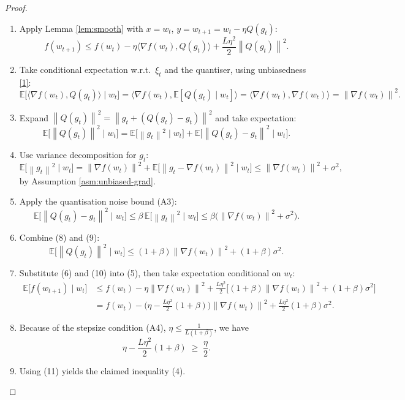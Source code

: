 \documentclass[11pt]{article}
\newcommand{\EE}{\mathbb{E}}
\newcommand{\norm}[1]{\left\lVert#1\right\rVert}
\newcommand{\inner}[2]{\langle #1,#2\rangle}
\begin{document}
\begin{proof}
\begin{enumerate}[label=[Step \arabic*]]
\item Apply Lemma \ref{lem:smooth} with $x=w_t$, $y=w_{t+1}=w_t-\eta Q(g_t)$:
\[
f(w_{t+1})\le f(w_t)-\eta\inner{\nabla f(w_t)}{Q(g_t)}+\frac{L\eta^2}{2}\norm{Q(g_t)}^2 .
\tag{5}
\]
\item Take conditional expectation w.r.t.\ $\xi_t$ and the quantiser, using unbiasedness \eqref{1}:
\[
\EE\!\big[\inner{\nabla f(w_t)}{Q(g_t)}\mid w_t\big]
= \inner{\nabla f(w_t)}{\EE[Q(g_t)\mid w_t]}
= \inner{\nabla f(w_t)}{\nabla f(w_t)} = \norm{\nabla f(w_t)}^2 .
\tag{6}
\]
\item Expand $\norm{Q(g_t)}^2=\norm{g_t+(Q(g_t)-g_t)}^2$ and take expectation:
\[
\EE\!\big[\norm{Q(g_t)}^2\mid w_t\big]
= \EE\!\big[\norm{g_t}^2\mid w_t\big] + \EE\!\big[\norm{Q(g_t)-g_t}^2\mid w_t\big] .
\tag{7}
\]
\item Use variance decomposition for $g_t$:
\[
\EE\!\big[\norm{g_t}^2\mid w_t\big]
= \norm{\nabla f(w_t)}^2 + \EE\!\big[\norm{g_t-\nabla f(w_t)}^2\mid w_t\big]
\le \norm{\nabla f(w_t)}^2 + \sigma^2 ,
\tag{8}
\]
by Assumption \ref{asm:unbiased-grad}.
\item Apply the quantisation noise bound (A3):
\[
\EE\!\big[\norm{Q(g_t)-g_t}^2\mid w_t\big]\le \beta\,\EE\!\big[\norm{g_t}^2\mid w_t\big]
\le \beta\big(\norm{\nabla f(w_t)}^2+\sigma^2\big).
\tag{9}
\]
\item Combine (8) and (9):
\[
\EE\!\big[\norm{Q(g_t)}^2\mid w_t\big]
\le (1+\beta)\norm{\nabla f(w_t)}^2 + (1+\beta)\sigma^2 .
\tag{10}
\]
\item Substitute (6) and (10) into (5), then take expectation conditional on $w_t$:
\begin{align*}
\EE\!\big[f(w_{t+1})\mid w_t\big]
&\le f(w_t)-\eta\norm{\nabla f(w_t)}^2
+\frac{L\eta^2}{2}\big[(1+\beta)\norm{\nabla f(w_t)}^2+(1+\beta)\sigma^2\big] \\[2mm]
&= f(w_t)-\Big(\eta-\frac{L\eta^2}{2}(1+\beta)\Big)\norm{\nabla f(w_t)}^2
+\frac{L\eta^2}{2}(1+\beta)\sigma^2 .
\end{align*}
\item Because of the stepsize condition (A4), $\eta\le \frac{1}{L(1+\beta)}$, we have
\[
\eta-\frac{L\eta^2}{2}(1+\beta)\;\ge\;\frac{\eta}{2}.
\tag{11}
\]
\item Using (11) yields the claimed inequality (4). \qedhere
\end{enumerate}
\end{proof}
\end{document}
